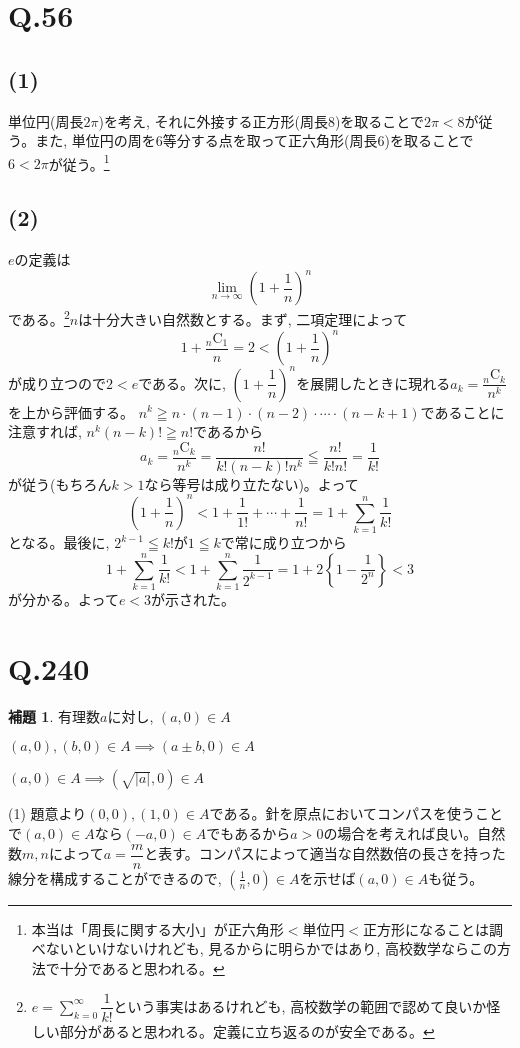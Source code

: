 \documentclass[twocolumn]{jbook}
\theoremstyle{definition}
\newtheorem{lem}[theo]{補題}
\newcommand{\disp}{\displaystyle}
\newcommand{\mr}{\mathrm}
\renewcommand{\leq}{\leqq}
\renewcommand{\geq}{\geqq}
\newcommand{\parena}[1]{\left( #1\right)}
\newcommand{\parenb}[1]{\left\{ #1\right\}}
\begin{document}
\section*{Q.56}
\subsection{(1)}
単位円(周長$2\pi$)を考え, それに外接する正方形(周長$8$)を取ることで$2\pi < 8$が従う。また, 単位円の周を6等分する点を取って正六角形(周長$6$)を取ることで$6<2\pi$が従う。\footnote{本当は「周長に関する大小」が正六角形$<$単位円$<$正方形になることは調べないといけないけれども, 見るからに明らかではあり, 高校数学ならこの方法で十分であると思われる。}
\subsection*{(2)}
$e$の定義は
\[\disp\lim_{n\to \infty} \parena{1+\dfrac{1}{n}}^{n}\]
である。\footnote{$e=\disp\sum_{k=0}^{\infty} \dfrac{1}{k!}$という事実はあるけれども, 高校数学の範囲で認めて良いか怪しい部分があると思われる。定義に立ち返るのが安全である。}$n$は十分大きい自然数とする。まず, 二項定理によって
\[1 + \dfrac{{}_{n}\mr{C}_{1}}{n} = 2 < \parena{1+\dfrac{1}{n}}^{n}\]
が成り立つので$2<e$である。次に, $\parena{1+\dfrac{1}{n}}^{n}$を展開したときに現れる$a_k = \dfrac{{}_{n}\mr{C}_{k}}{n^{k}}$を上から評価する。
$n^{k} \geq n\cdot (n-1) \cdot  (n-2) \cdot \cdots  \cdot (n-k+1) $であることに注意すれば, $n^{k} (n-k)! \geq n!$であるから
\[a_k = \dfrac{{}_{n}\mr{C}_{k}}{n^{k}} = \dfrac{n!}{k!(n-k)!n^{k}} \leq \dfrac{n!}{k! n!} = \dfrac{1}{k!}\]
が従う(もちろん$k>1$なら等号は成り立たない)。よって
\[\parena{1+\dfrac{1}{n}}^{n} < 1+\dfrac{1}{1!} + \cdots + \dfrac{1}{n!} =1 +  \disp\sum_{k=1}^{n} \dfrac{1}{k!}\]
となる。最後に, $2^{k-1} \leq k!$が$1\leq k$で常に成り立つから
\[1+\disp\sum_{k=1}^{n} \dfrac{1}{k!} <1+ \disp\sum_{k=1}^{n} \dfrac{1}{2^{k-1}} = 1+2\parenb{1-\dfrac{1}{2^{n}}} < 3\]
が分かる。よって$e<3$が示された。



\clearpage
\section{Q.240}
\begin{lem}
\item 有理数$a$に対し, $(a,0)\in A$
\item $(a,0), (b,0) \in A \implies (a\pm b, 0)\in A $
\item $(a,0)\in A \implies (\sqrt{|a|}, 0)\in A$
\end{lem}
(1) 題意より$(0,0), (1,0)\in A$である。針を原点においてコンパスを使うことで$(a,0)\in A$なら$(-a,0)\in A$でもあるから$a>0$の場合を考えれば良い。自然数$m,n$によって$a=\dfrac{m}{n}$と表す。コンパスによって適当な自然数倍の長さを持った線分を構成することができるので, $(\frac{1}{n}, 0)\in A$を示せば$(a,0)\in A$も従う。
\end{document}
